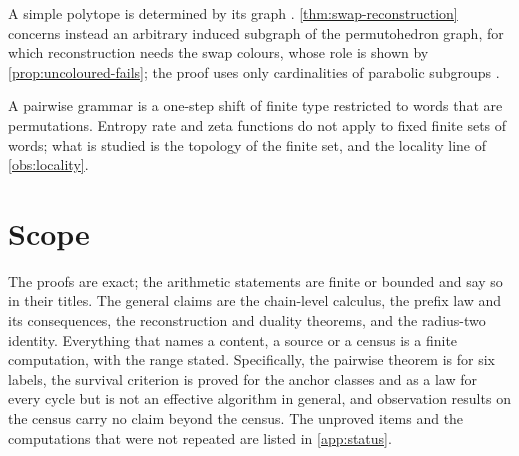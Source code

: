 \begin{description}[leftmargin=1.4em,nosep]
\item[Polytope reconstruction.] A simple polytope is determined by its graph \cite{BlindManiLevitska,Kalai88,Ziegler}. \cref{thm:swap-reconstruction} concerns instead an arbitrary induced subgraph of the permutohedron graph, for which reconstruction needs the swap colours, whose role is shown by \cref{prop:uncoloured-fails}; the proof uses only cardinalities of parabolic subgroups \cite{BjornerBrenti}.
\item[Symbolic dynamics.] A pairwise grammar is a one-step shift of finite type \cite{LindMarcus} restricted to words that are permutations. Entropy rate and zeta functions do not apply to fixed finite sets of words; what is studied is the topology of the finite set, and the locality line of \cref{obs:locality}.
\end{description}

\section{Scope}\label{sec:scope}
The proofs are exact; the arithmetic statements are finite or bounded and say so in their titles. The general claims are the chain-level calculus, the prefix law and its consequences, the reconstruction and duality theorems, and the radius-two identity. Everything that names a content, a source or a census is a finite computation, with the range stated. Specifically, the pairwise theorem is for six labels, the survival criterion is proved for the anchor classes and as a law for every cycle but is not an effective algorithm in general, and observation results on the census carry no claim beyond the census. The unproved items and the computations that were not repeated are listed in \cref{app:status}.
